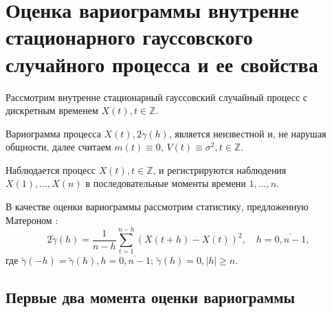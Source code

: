 
\newpage

\chapter{Оценка вариограммы внутренне стационарного гауссовского случайного процесса и ее свойства}
\label{c:variogram_estimation}

Рассмотрим внутренне стационарный гауссовский случайный процесс с дискретным временем $ X(t), t \in \mathbb{Z} $.

Вариограмма процесса $ X(t) , 2 \gamma(h) $, является неизвестной и, не нарушая общности, далее считаем $ m(t) \equiv 0 $, $ V(t) \equiv \sigma^2 , t \in \mathbb{Z}$.

Наблюдается процесс $ X(t), t \in \mathbb{Z} $, и регистрируются наблюдения $ X(1), \dots, X(n) $ в последовательные моменты времени $ 1, \dots, n $.

В качестве оценки вариограммы рассмотрим статистику, предложенную Матероном \cite{matheron1980}:
\begin{equation}
\label{eq:var_estimation}
	2 \tilde{\gamma}(h) = \frac{1}{n - h} \sum_{t = 1}^{n - h}(X(t + h) - X(t))^2, \quad h = \overline{0, n - 1},
\end{equation}
где $ \tilde{\gamma}(-h) = \tilde{\gamma}(h), h = \overline{0, n - 1}$; $ \tilde{\gamma}(h) = 0, \vert h \vert \ge n $.

\section{Первые два момента оценки вариограммы} %
\label{sec:variogram_moments}

